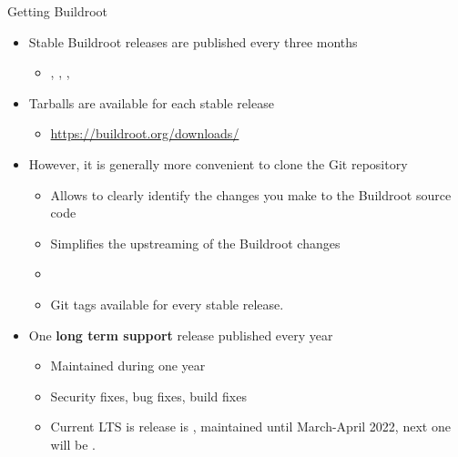 \begin{frame}{Getting Buildroot}
  \begin{itemize}
  \item Stable Buildroot releases are published every three months
    \begin{itemize}
    \item {}, , ,
    \end{itemize}
  \item Tarballs are available for each stable release
    \begin{itemize}
    \item \url{https://buildroot.org/downloads/}
    \end{itemize}
  \item However, it is generally more convenient to clone the Git
    repository
    \begin{itemize}
    \item Allows to clearly identify the changes you make to the
      Buildroot source code
    \item Simplifies the upstreaming of the Buildroot changes
    \item {}
    \item Git tags available for every stable release.
    \end{itemize}
  \item One {\bf long term support} release published every year
    \begin{itemize}
    \item Maintained during one year
    \item Security fixes, bug fixes, build fixes
    \item Current LTS is release is , maintained until
      March-April 2022, next one will be .
    \end{itemize}
  \end{itemize}
\end{frame}

